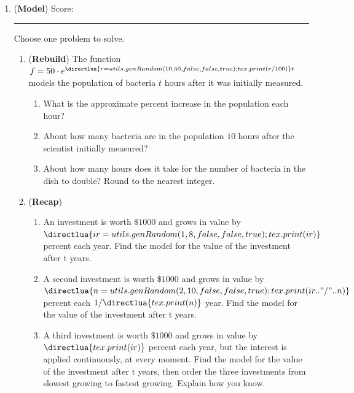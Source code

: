\begin{enumerate}
\item ({\textbf{Model}}) Score: \rule{2em}{.4pt} 

Choose one problem to solve.
\begin{enumerate}
\item
(\textbf{Rebuild}) The function $f = 50\cdot e^{\directlua{r = utils.genRandom(10,50, false,false, true);tex.print(r/100)}t}$ models the population of bacteria $t$ hours after it was initially measured. 
\begin{enumerate}
\item
What is the approximate percent increase in the population each hour?
\item About how many bacteria are in the population $10$ hours after the scientist initially measured?
\item About how many hours does it take for the number of bacteria in the dish to double? Round to the nearest integer. 
\end{enumerate}
\item
(\textbf{Recap})
\begin{enumerate}
\item
An investment is worth $\$1000$ and grows in value by $\directlua{ir=utils.genRandom(1,8, false, false, true);tex.print(ir)}$ percent each year. Find the model for the value of the investment after t years.
\item  A second investment is worth $\$1000$ and grows in value by $\directlua{n=utils.genRandom(2,10, false, false, true);tex.print(ir .. "/" .. n)}$ percent each $1/\directlua{tex.print(n)}$ year. Find the model for the value of the investment after t years.
\item A third investment is worth $\$1000$ and grows in value by $\directlua{tex.print(ir)}$ percent each year, but the interest is applied continuously, at every moment. Find the model for the value of the investment after t years, then order the three investments from slowest growing to fastest growing. Explain how you know.
\end{enumerate}
\end{enumerate}
\end{enumerate}
\clearpage